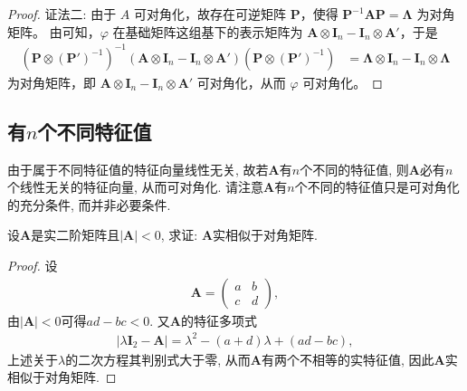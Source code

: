 \documentclass[../../main.tex]{subfiles}
\begin{document}
\begin{proof}
{\color{blue}证法二:}
由于 $A$ 可对角化，故存在可逆矩阵 $\boldsymbol{P}$，使得 $\boldsymbol{P}^{-1}\boldsymbol{AP} = \boldsymbol{\Lambda}$ 为对角矩阵。
由可知，$\varphi$ 在基础矩阵这组基下的表示矩阵为 $\boldsymbol{A} \otimes \boldsymbol{I}_n - \boldsymbol{I}_n \otimes \boldsymbol{A}'$，于是
\begin{align*}
(\boldsymbol{P} \otimes (\boldsymbol{P}')^{-1})^{-1}(\boldsymbol{A} \otimes \boldsymbol{I}_n - \boldsymbol{I}_n \otimes \boldsymbol{A}')(\boldsymbol{P} \otimes (\boldsymbol{P}')^{-1}) 
&= \boldsymbol{\Lambda} \otimes \boldsymbol{I}_n - \boldsymbol{I}_n \otimes \boldsymbol{\Lambda}
\end{align*}
为对角矩阵，即 $\boldsymbol{A} \otimes \boldsymbol{I}_n - \boldsymbol{I}_n \otimes \boldsymbol{A}'$ 可对角化，从而 $\varphi$ 可对角化。
\end{proof}

\subsection{有$n$个不同特征值}

由于属于不同特征值的特征向量线性无关, 故若$\boldsymbol{A}$有$n$个不同的特征值, 则$\boldsymbol{A}$必有$n$个线性无关的特征向量, 从而可对角化. 请注意$\boldsymbol{A}$有$n$个不同的特征值只是可对角化的充分条件, 而并非必要条件. 

\begin{example}
设$\boldsymbol{A}$是实二阶矩阵且$|\boldsymbol{A}|< 0$, 求证: $\boldsymbol{A}$实相似于对角矩阵.
\end{example}
\begin{proof}
设
\begin{align*}
\boldsymbol{A}=\begin{pmatrix}
a&b\\
c&d
\end{pmatrix},
\end{align*}
由$|\boldsymbol{A}|< 0$可得$ad - bc< 0$. 又$\boldsymbol{A}$的特征多项式
\begin{align*}
|\lambda\boldsymbol{I}_2-\boldsymbol{A}|=\lambda^2-(a + d)\lambda+(ad - bc),
\end{align*}
上述关于$\lambda$的二次方程其判别式大于零, 从而$\boldsymbol{A}$有两个不相等的实特征值, 因此$\boldsymbol{A}$实相似于对角矩阵.
\end{proof}
\end{document}
